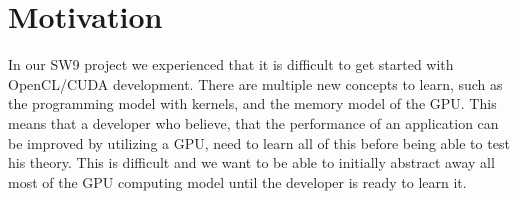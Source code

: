\section{Motivation}
In our SW9 project we experienced that it is difficult to get started with OpenCL/CUDA development. There are multiple new concepts to learn, such as the programming model with kernels, and the memory model of the GPU. This means that a developer who believe, that the performance of an application can be improved by utilizing a GPU, need to learn all of this before being able to test his theory. This is difficult and we want to be able to initially abstract away all most of the GPU computing model until the developer is ready to learn it.

